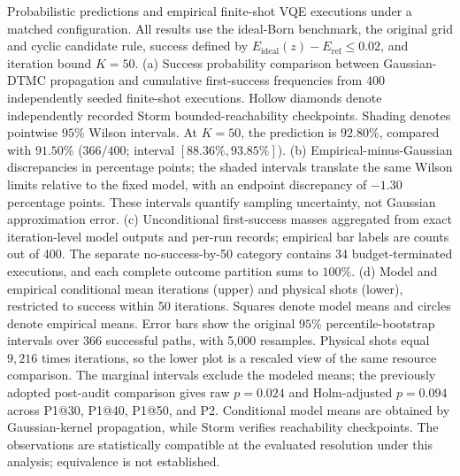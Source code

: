 \caption{Probabilistic predictions and empirical finite-shot VQE executions under a matched configuration. All results use the ideal-Born benchmark, the original grid and cyclic candidate rule, success defined by $E_{\mathrm{ideal}}(z)-E_{\mathrm{ref}}\leq 0.02$, and iteration bound $K=50$.
(a) Success probability comparison between Gaussian-DTMC propagation and cumulative first-success frequencies from 400 independently seeded finite-shot executions. Hollow diamonds denote independently recorded Storm bounded-reachability checkpoints. Shading denotes pointwise $95\%$ Wilson intervals. At $K=50$, the prediction is $92.80\%$, compared with $91.50\%$ ($366/400$; interval $[88.36\%,93.85\%]$).
(b) Empirical-minus-Gaussian discrepancies in percentage points; the shaded intervals translate the same Wilson limits relative to the fixed model, with an endpoint discrepancy of $-1.30$ percentage points. These intervals quantify sampling uncertainty, not Gaussian approximation error.
(c) Unconditional first-success masses aggregated from exact iteration-level model outputs and per-run records; empirical bar labels are counts out of 400. The separate no-success-by-50 category contains 34 budget-terminated executions, and each complete outcome partition sums to $100\%$.
(d) Model and empirical conditional mean iterations (upper) and physical shots (lower), restricted to success within 50 iterations. Squares denote model means and circles denote empirical means. Error bars show the original $95\%$ percentile-bootstrap intervals over 366 successful paths, with 5,000 resamples. Physical shots equal $9{,}216$ times iterations, so the lower plot is a rescaled view of the same resource comparison. The marginal intervals exclude the modeled means; the previously adopted post-audit comparison gives raw $p=0.024$ and Holm-adjusted $p=0.094$ across P1@30, P1@40, P1@50, and P2. Conditional model means are obtained by Gaussian-kernel propagation, while Storm verifies reachability checkpoints. The observations are statistically compatible at the evaluated resolution under this analysis; equivalence is not established.}
\label{fig:probabilistic-results-expanded}
